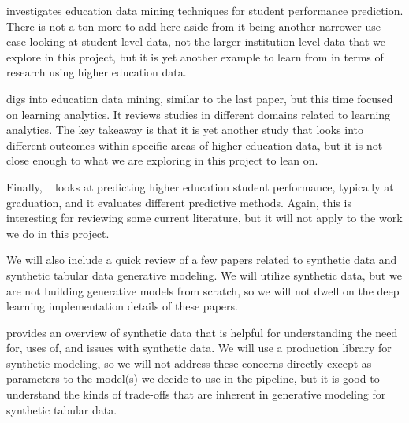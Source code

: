 \documentclass[sigconf, authorversion, nonacm]{acmart}
\begin{document}
    \cite{10.3389/fpsyg.2021.698490} investigates education data mining techniques for student performance prediction. There is not a ton more to add here aside from it being another narrower use case looking at student-level data, not the larger institution-level data that we explore in this project, but it is yet another example to learn from in terms of research using higher education data.

    \cite{ALDOWAH201913} digs into education data mining, similar to the last paper, but this time focused on learning analytics. It reviews studies in different domains related to learning analytics. The key takeaway is that it is yet another study that looks into different outcomes within specific areas of higher education data, but it is not close enough to what we are exploring in this project to lean on.

    Finally, ~\cite{https://doi.org/10.1155/2022/8924028} looks at predicting higher education student performance, typically at graduation, and it evaluates different predictive methods. Again, this is interesting for reviewing some current literature, but it will not apply to the work we do in this project.

    We will also include a quick review of a few papers related to synthetic data and synthetic tabular data generative modeling. We will utilize synthetic data, but we are not building generative models from scratch, so we will not dwell on the deep learning implementation details of these papers.

    \cite{decristofaro2024syntheticdatamethodsuse} provides an overview of synthetic data that is helpful for understanding the need for, uses of, and issues with synthetic data. We will use a production library for synthetic modeling, so we will not address these concerns directly except as parameters to the model(s) we decide to use in the pipeline, but it is good to understand the kinds of trade-offs that are inherent in generative modeling for synthetic tabular data.
\end{document}
